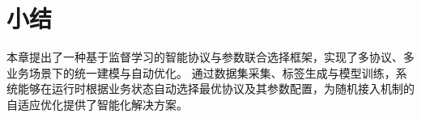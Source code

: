 \section{小结}

本章提出了一种基于监督学习的智能协议与参数联合选择框架，实现了多协议、多业务场景下的统一建模与自动优化。  
通过数据集采集、标签生成与模型训练，系统能够在运行时根据业务状态自动选择最优协议及其参数配置，为随机接入机制的自适应优化提供了智能化解决方案。